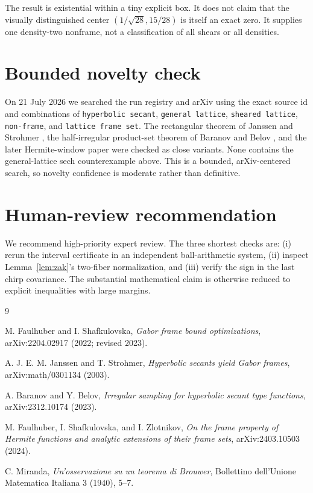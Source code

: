 \documentclass[11pt]{article}
\begin{document}
The result is existential within a tiny explicit box.  It does not claim
that the visually distinguished center \((1/\sqrt{28},15/28)\) is itself an
exact zero.  It supplies one density-two nonframe, not a classification of
all shears or all densities.

\section{Bounded novelty check}

On 21 July 2026 we searched the run registry and arXiv using the exact source
id and combinations of \texttt{hyperbolic secant}, \texttt{general lattice},
\texttt{sheared lattice}, \texttt{non-frame}, and \texttt{lattice frame set}.
The rectangular theorem of Janssen and Strohmer \cite{JanssenStrohmer}, the
half-irregular product-set theorem of Baranov and Belov
\cite{BaranovBelov}, and the later Hermite-window paper
\cite{HermiteFrames} were checked as close variants.  None contains the
general-lattice sech counterexample above.  This is a bounded, arXiv-centered
search, so novelty confidence is moderate rather than definitive.

\section{Human-review recommendation}

We recommend high-priority expert review.  The three shortest checks are:
(i) rerun the interval certificate in an independent ball-arithmetic system,
(ii) inspect Lemma~\ref{lem:zak}'s two-fiber normalization, and (iii) verify
the sign in the last chirp covariance.  The substantial mathematical claim
is otherwise reduced to explicit inequalities with large margins.

\begin{thebibliography}{9}

M. Faulhuber and I. Shafkulovska,
\emph{Gabor frame bound optimizations},
arXiv:2204.02917 (2022; revised 2023).

A. J. E. M. Janssen and T. Strohmer,
\emph{Hyperbolic secants yield Gabor frames},
arXiv:math/0301134 (2003).

A. Baranov and Y. Belov,
\emph{Irregular sampling for hyperbolic secant type functions},
arXiv:2312.10174 (2023).

M. Faulhuber, I. Shafkulovska, and I. Zlotnikov,
\emph{On the frame property of Hermite functions and analytic extensions
of their frame sets}, arXiv:2403.10503 (2024).

C. Miranda,
\emph{Un'osservazione su un teorema di Brouwer},
Bollettino dell'Unione Matematica Italiana 3 (1940), 5--7.

\end{thebibliography}
\end{document}
